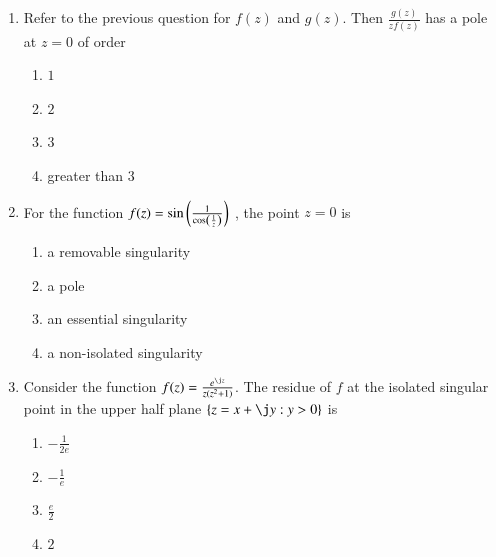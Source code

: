 \documentclass[journal,12pt,twocolumn]{IEEEtran}
\begin{document}
\begin{enumerate}[1.]
\item Refer to the previous question for $f(z)$ and $g(z)$.  Then $\frac{g(z)}{z f(z)}$ has a pole at $z=0$ of order

\begin{enumerate}

\item $
1
$

\item $
2
$

\item $
3
$

\item 
greater than $3$


\end{enumerate}


\item For the function $ f(z)= \sin \left( \frac{1}{\cos\left(\frac{1}{z}\right)} \right)$ , the point $z=0$ is

\begin{enumerate}

\item 
a removable singularity

\item 
a pole

\item 
an essential singularity

\item 
a non-isolated singularity

\end{enumerate}

%
%



\item Consider the function $f(z) = \frac{e^{\j z}}{z(z^2+1)}$. The residue of $f$ at the isolated singular point in the upper half plane 
$ \lbrace z=x+\j y : y>0 \rbrace $ is

\begin{enumerate}

\item $
-\frac{1}{2e}
$

\item $
-\frac{1}{e}
$

\item $
\frac{e}{2}
$

\item $
2
$


\end{enumerate}
\end{enumerate}
\end{document}
